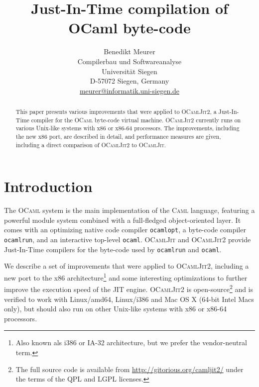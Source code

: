 \documentclass[12pt,a4paper,final]{article}
\begin{document}
\title{%
  Just-In-Time compilation of OCaml byte-code
}
\author{%
  Benedikt Meurer\\
  Compilerbau und Softwareanalyse\\
  Universit\"at Siegen\\
  D-57072 Siegen, Germany\\
  \url{meurer@informatik.uni-siegen.de}
}
\date{}
\maketitle
\begin{abstract}
  This paper presents various improvements that were applied to
  \textsc{OCamlJit2}, a Just-In-Time compiler for the \textsc{OCaml}
  byte-code virtual machine. \textsc{OCamlJit2} currently runs on
  various Unix-like systems with x86 or x86-64 processors. The
  improvements, including the new x86 port, are described in detail,
  and performance measures are given, including a direct
  comparison of \textsc{OCamlJit2} to \textsc{OCamlJit}.
\end{abstract}


\section{Introduction}

The \textsc{OCaml} system \cite{Leroy10,Remy02} is the main implementation of the
\textsc{Caml} language, featuring a powerful module system combined with a full-fledged
object-oriented layer. It comes with an optimizing native code compiler \texttt{ocamlopt},
a byte-code compiler \texttt{ocamlrun}, and an interactive top-level \texttt{ocaml}.
\textsc{OCamlJit} \cite{Starynkevitch04} and \textsc{OCamlJit2} \cite{Meurer10:OCamlJit2.0}
provide Just-In-Time compilers for the byte-code used by \texttt{ocamlrun} and
\texttt{ocaml}.

We describe a set of improvements that were applied to \textsc{OCamlJit2},
including a new port to the x86 architecture\footnote{Also known als i386 or IA-32 architecture,
but we prefer the vendor-neutral term.} and some interesting optimizations to further
improve the execution speed of the JIT engine. \textsc{OCamlJit2} is open-source\footnote{The
full source code is available from \url{http://gitorious.org/camljit2/} under the terms of
the QPL and LGPL licenses.} and is verified to work with Linux/amd64, Linux/i386 and Mac OS X
(64-bit Intel Macs only), but should also run on other Unix-like systems with x86 or x86-64
processors.
\end{document}
